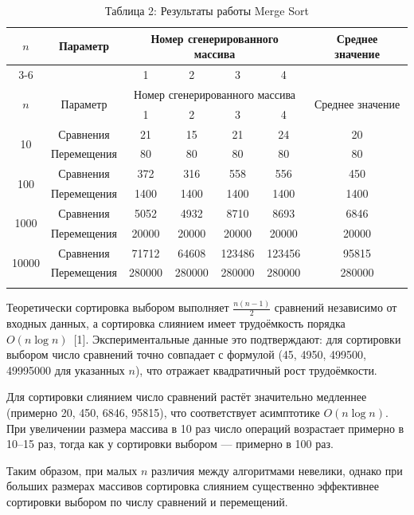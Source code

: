 \documentclass[a4paper,12pt]{article}
\begin{document}
\begin{longtable}{|c|c|c|c|c|c|c|}
\hline
\multirow{2}{*}{$n$} & \multirow{2}{*}{Параметр} &
\multicolumn{4}{c|}{Номер сгенерированного массива} & \multirow{2}{*}{Среднее значение} \\
\cline{3-6}
 & & 1 & 2 & 3 & 4 & \\
\hline
\endfirsthead

\hline
\multirow{2}{*}{$n$} & \multirow{2}{*}{Параметр} &
\multicolumn{4}{c|}{Номер сгенерированного массива} & \multirow{2}{*}{Среднее значение} \\
\cline{3-6}
 & & 1 & 2 & 3 & 4 & \\
\hline
\endhead
\multirow{2}{*}{10}
& Сравнения & 21 & 15 & 21 & 24 & 20 \\
& Перемещения & 80 & 80 & 80 & 80 & 80 \\
\hline
\multirow{2}{*}{100}
& Сравнения & 372 & 316 & 558 & 556 & 450 \\
& Перемещения & 1400 & 1400 & 1400 & 1400 & 1400 \\
\hline
\multirow{2}{*}{1000}
& Сравнения & 5052 & 4932 & 8710 & 8693 & 6846 \\
& Перемещения & 20000 & 20000 & 20000 & 20000 & 20000 \\
\hline
\multirow{2}{*}{10000}
& Сравнения & 71712 & 64608 & 123486 & 123456 & 95815 \\
& Перемещения & 280000 & 280000 & 280000 & 280000 & 280000 \\
\hline
\caption{Таблица 2: Результаты работы Merge Sort}
\end{longtable}

Теоретически сортировка выбором выполняет $\frac{n(n-1)}{2}$ сравнений независимо от
входных данных, а сортировка слиянием имеет трудоёмкость порядка $O(n\log n)$~[1].
Экспериментальные данные это подтверждают: для сортировки выбором число сравнений
точно совпадает с формулой (45, 4950, 499500, 49995000 для указанных $n$), что
отражает квадратичный рост трудоёмкости.

Для сортировки слиянием число сравнений растёт значительно медленнее (примерно
20, 450, 6846, 95815), что соответствует асимптотике $O(n\log n)$. При увеличении
размера массива в 10 раз число операций возрастает примерно в 10–15 раз, тогда
как у сортировки выбором — примерно в 100 раз.

Таким образом, при малых $n$ различия между алгоритмами невелики, однако при
больших размерах массивов сортировка слиянием существенно эффективнее сортировки
выбором по числу сравнений и перемещений.
\end{document}
